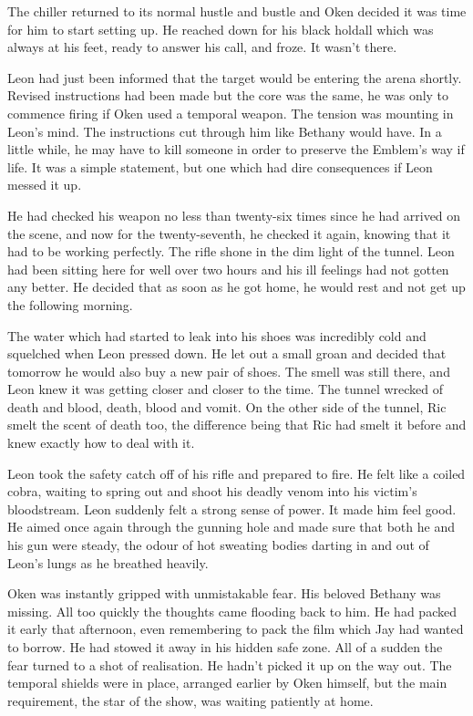The chiller returned to its normal hustle and bustle and Oken decided it was time for him to start setting up.  He reached down for his black holdall which was always at his feet, ready to answer his call, and froze.  It wasn't there.



\thoughtbreak



Leon had just been informed that the target would be entering the arena shortly.  Revised instructions had been made but the core was the same, he was only to commence firing if Oken used a temporal weapon.  The tension was mounting in Leon's mind.  The instructions cut through him like Bethany would have.  In a little while, he may have to kill someone in order to preserve the Emblem's way if life.  It was a simple statement, but one which had dire consequences if Leon messed it up.  

He had checked his weapon no less than twenty-six times since he had arrived on the scene, and now for the twenty-seventh, he checked it again, knowing that it had to be working perfectly.  The rifle shone in the dim light of the tunnel.  Leon had been sitting here for well over two hours and his ill feelings had not gotten any better.  He decided that as soon as he got home, he would rest and not get up the following morning.

The water which had started to leak into his shoes was incredibly cold and squelched when Leon pressed down.  He let out a small groan and decided that tomorrow he would also buy a new pair of shoes.  The smell was still there, and Leon knew it was getting closer and closer to the time.  The tunnel wrecked of death and blood, death, blood and vomit.  On the other side of the tunnel, Ric smelt the scent of death too, the difference being that Ric had smelt it before and knew exactly how to deal with it.  

Leon took the safety catch off of his rifle and prepared to fire.  He felt like a coiled cobra, waiting to spring out and shoot his deadly venom into his victim's bloodstream.  Leon suddenly felt a strong sense of power.  It made him feel good.  He aimed once again through the gunning hole and made sure that both he and his gun were steady, the odour of hot sweating bodies darting in and out of Leon's lungs as he breathed heavily.



\thoughtbreak



Oken was instantly gripped with unmistakable fear.  His beloved Bethany was missing.  All too quickly the thoughts came flooding back to him.  He had packed it early that afternoon, even remembering to pack the film which Jay had wanted to borrow.  He had stowed it away in his hidden safe zone.  All of a sudden the fear turned to a shot of realisation.  He hadn't picked it up on the way out.  The temporal shields were in place, arranged earlier by Oken himself, but the main requirement, the star of the show, was waiting patiently at home.

